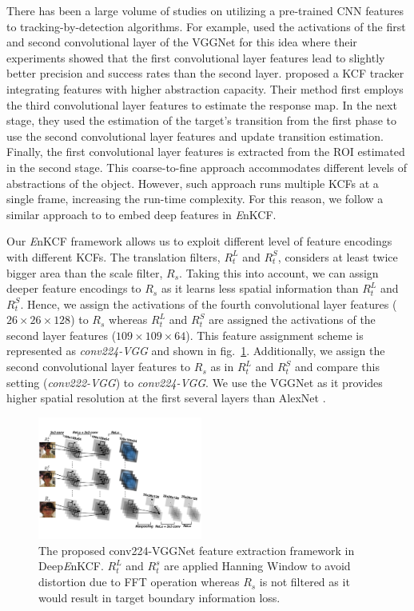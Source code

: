 \documentclass[10pt,twocolumn,letterpaper]{article}
\begin{document}
There has been a large volume of studies on utilizing a pre-trained
CNN features to tracking-by-detection algorithms. For example,
\cite{danelljan2015convolutional} used the activations of the first
and second convolutional layer of the VGGNet \cite{simonyan2014very}
for this idea where their experiments showed that the
first convolutional layer features lead to slightly better precision
and success rates than the second layer. \cite{ma2015hierarchical}
proposed a KCF tracker integrating features with higher abstraction capacity. 
Their method first employs the third convolutional layer features to estimate the response map. In
the next stage, they used the estimation of the target's transition
from the first phase to use the second convolutional layer features
and update transition estimation.  Finally, the first convolutional
layer features is extracted from the ROI estimated in the second
stage. This coarse-to-fine approach accommodates
different levels of abstractions of the object. However, such approach
runs multiple KCFs at a single frame, increasing the run-time
complexity. For this reason, we follow a similar approach to
\cite{danelljan2015convolutional} to embed deep features in {\it
  E}nKCF.

Our {\it E}nKCF framework allows us to exploit different level of
feature encodings with different KCFs. The translation filters,
$R_{t}^{L}$ and $R_{t}^{S}$, considers at least twice bigger area than
the scale filter, $R_{s}$. Taking this into account, we can assign deeper feature
encodings to $R_{s}$ as it learns less spatial information than
$R_{t}^{L}$ and $R_{t}^{S}$. Hence, we assign the activations of the
fourth convolutional layer features ($26\times26\times128$) to $R_{s}$
whereas $R_{t}^{L}$ and $R_{t}^{S}$ are assigned the activations of
the second layer features ($109\times109\times64$). This feature
assignment scheme is represented as \textit{conv224-VGG} and shown in
fig.~\ref{fig:Filters_CNN}. Additionally, we assign the second
convolutional layer features to $R_{s}$ as in $R_{t}^{L}$ and
$R_{t}^{S}$ and compare this setting (\textit{conv222-VGG}) to
\textit{conv224-VGG}. We use the VGGNet as it provides higher spatial
resolution at the first several layers than AlexNet
\cite{krizhevsky2012imagenet}.

\begin{figure}[!h]
\centering
\includegraphics[width=0.48\textwidth]{./figures/Filters_Details_CNN.pdf}
\caption{The proposed conv224-VGGNet feature extraction framework in Deep{\it E}nKCF. $R_{t}^{L}$ and $R_{t}^{s}$ are applied Hanning Window
to avoid distortion due to FFT operation whereas $R_{s}$ is not filtered as it would result in target boundary information loss.}
\label{fig:Filters_CNN}
\end{figure}
\end{document}

